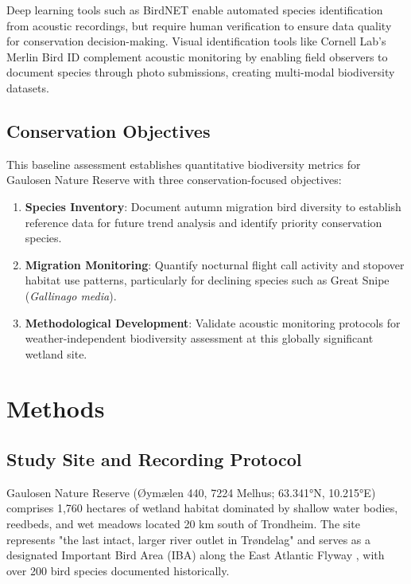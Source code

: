 \documentclass[twocolumn]{article}
\begin{document}
Deep learning tools such as BirdNET \citep{Kahl2021, Wood2022} enable automated species identification from acoustic recordings, but require human verification to ensure data quality for conservation decision-making. Visual identification tools like Cornell Lab's Merlin Bird ID \citep{MerlinID2024} complement acoustic monitoring by enabling field observers to document species through photo submissions, creating multi-modal biodiversity datasets.

\subsection{Conservation Objectives}

This baseline assessment establishes quantitative biodiversity metrics for Gaulosen Nature Reserve with three conservation-focused objectives:

\begin{enumerate}
\item \textbf{Species Inventory}: Document autumn migration bird diversity to establish reference data for future trend analysis and identify priority conservation species.

\item \textbf{Migration Monitoring}: Quantify nocturnal flight call activity and stopover habitat use patterns, particularly for declining species such as Great Snipe (\textit{Gallinago media}).

\item \textbf{Methodological Development}: Validate acoustic monitoring protocols for weather-independent biodiversity assessment at this globally significant wetland site.
\end{enumerate}

\section{Methods}

\subsection{Study Site and Recording Protocol}

Gaulosen Nature Reserve (Øymælen 440, 7224 Melhus; 63.341°N, 10.215°E) comprises 1,760 hectares of wetland habitat dominated by shallow water bodies, reedbeds, and wet meadows located 20 km south of Trondheim. The site represents "the last intact, larger river outlet in Trøndelag" and serves as a designated Important Bird Area (IBA) along the East Atlantic Flyway \citep{BirdLife2024}, with over 200 bird species documented historically.
\end{document}

